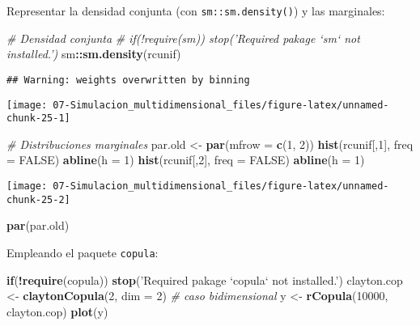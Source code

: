 \documentclass[
]{book}
\newenvironment{Shaded}{\begin{snugshade}}{\end{snugshade}}
\newcommand{\CommentTok}[1]{\textcolor[rgb]{0.56,0.35,0.01}{\textit{#1}}}
\newcommand{\ControlFlowTok}[1]{\textcolor[rgb]{0.13,0.29,0.53}{\textbf{#1}}}
\newcommand{\DataTypeTok}[1]{\textcolor[rgb]{0.13,0.29,0.53}{#1}}
\newcommand{\DecValTok}[1]{\textcolor[rgb]{0.00,0.00,0.81}{#1}}
\newcommand{\KeywordTok}[1]{\textcolor[rgb]{0.13,0.29,0.53}{\textbf{#1}}}
\newcommand{\NormalTok}[1]{#1}
\newcommand{\OperatorTok}[1]{\textcolor[rgb]{0.81,0.36,0.00}{\textbf{#1}}}
\newcommand{\OtherTok}[1]{\textcolor[rgb]{0.56,0.35,0.01}{#1}}
\newcommand{\StringTok}[1]{\textcolor[rgb]{0.31,0.60,0.02}{#1}}
\theoremstyle{break}
\theoremstyle{definition}
\theoremstyle{definition}
\theoremstyle{definition}
\theoremstyle{remark}
\begin{document}
\begin{enumerate}
  Representar la densidad conjunta (con \texttt{sm::sm.density()}) y las marginales:

\begin{Shaded}
\begin{Highlighting}[]
\CommentTok{# Densidad conjunta}
\CommentTok{# if(!require(sm)) stop('Required pakage `sm` not installed.')}
\NormalTok{sm}\OperatorTok{::}\KeywordTok{sm.density}\NormalTok{(rcunif)}
\end{Highlighting}
\end{Shaded}

\begin{verbatim}
## Warning: weights overwritten by binning
\end{verbatim}

  \begin{center}\texttt{[image: 07-Simulacion\_multidimensional\_files/figure-latex/unnamed-chunk-25-1]} \end{center}

\begin{Shaded}
\begin{Highlighting}[]
\CommentTok{# Distribuciones marginales}
\NormalTok{par.old <-}\StringTok{ }\KeywordTok{par}\NormalTok{(}\DataTypeTok{mfrow =} \KeywordTok{c}\NormalTok{(}\DecValTok{1}\NormalTok{, }\DecValTok{2}\NormalTok{))}
\KeywordTok{hist}\NormalTok{(rcunif[,}\DecValTok{1}\NormalTok{], }\DataTypeTok{freq =} \OtherTok{FALSE}\NormalTok{)}
\KeywordTok{abline}\NormalTok{(}\DataTypeTok{h =} \DecValTok{1}\NormalTok{)}
\KeywordTok{hist}\NormalTok{(rcunif[,}\DecValTok{2}\NormalTok{], }\DataTypeTok{freq =} \OtherTok{FALSE}\NormalTok{)}
\KeywordTok{abline}\NormalTok{(}\DataTypeTok{h =} \DecValTok{1}\NormalTok{)}
\end{Highlighting}
\end{Shaded}

  \begin{center}\texttt{[image: 07-Simulacion\_multidimensional\_files/figure-latex/unnamed-chunk-25-2]} \end{center}

\begin{Shaded}
\begin{Highlighting}[]
\KeywordTok{par}\NormalTok{(par.old)}
\end{Highlighting}
\end{Shaded}

  Empleando el paquete \texttt{copula}:

\begin{Shaded}
\begin{Highlighting}[]
\ControlFlowTok{if}\NormalTok{(}\OperatorTok{!}\KeywordTok{require}\NormalTok{(copula)) }\KeywordTok{stop}\NormalTok{(}\StringTok{'Required pakage `copula` not installed.'}\NormalTok{)}
\NormalTok{clayton.cop <-}\StringTok{ }\KeywordTok{claytonCopula}\NormalTok{(}\DecValTok{2}\NormalTok{, }\DataTypeTok{dim =} \DecValTok{2}\NormalTok{) }\CommentTok{# caso bidimensional}
\NormalTok{y <-}\StringTok{ }\KeywordTok{rCopula}\NormalTok{(}\DecValTok{10000}\NormalTok{, clayton.cop)}
\KeywordTok{plot}\NormalTok{(y)}
\end{Highlighting}
\end{Shaded}


\end{enumerate}
\end{document}
